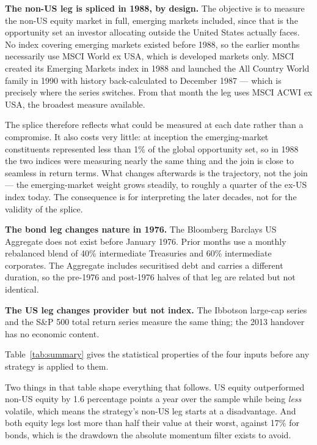 \documentclass[11pt,a4paper]{article}
\begin{document}
\textbf{The non-US leg is spliced in 1988, by design.} The objective is to
measure the non-US equity market in full, emerging markets included, since that
is the opportunity set an investor allocating outside the United States
actually faces. No index covering emerging markets existed before 1988, so the
earlier months necessarily use MSCI World ex USA, which is developed markets
only. MSCI created its Emerging Markets index in 1988 and launched the All
Country World family in 1990 with history back-calculated to December 1987 ---
which is precisely where the series switches. From that month the leg uses MSCI
ACWI ex USA, the broadest measure available.

The splice therefore reflects what could be measured at each date rather than a
compromise. It also costs very little: at inception the emerging-market
constituents represented less than 1\% of the global opportunity set, so in
1988 the two indices were measuring nearly the same thing and the join is
close to seamless in return terms. What changes afterwards is the trajectory,
not the join --- the emerging-market weight grows steadily, to roughly a
quarter of the ex-US index today. The consequence is for interpreting the later
decades, not for the validity of the splice.

\textbf{The bond leg changes nature in 1976.} The Bloomberg Barclays US
Aggregate does not exist before January 1976. Prior months use a monthly
rebalanced blend of 40\% intermediate Treasuries and 60\% intermediate
corporates. The Aggregate includes securitised debt and carries a different
duration, so the pre-1976 and post-1976 halves of that leg are related but not
identical.

\textbf{The US leg changes provider but not index.} The Ibbotson large-cap
series and the S\&P 500 total return series measure the same thing; the 2013
handover has no economic content.

Table~\ref{tab:summary} gives the statistical properties of the four inputs
before any strategy is applied to them.

\begin{table}[htbp]
  \centering
  \caption{Summary statistics of the four input series.}
  \label{tab:summary}
  
\end{table}

Two things in that table shape everything that follows. US equity outperformed
non-US equity by 1.6 percentage points a year over the sample while being
\emph{less} volatile, which means the strategy's non-US leg starts at a
disadvantage. And both equity legs lost more than half their value at their
worst, against 17\% for bonds, which is the drawdown the absolute momentum
filter exists to avoid.
\end{document}
